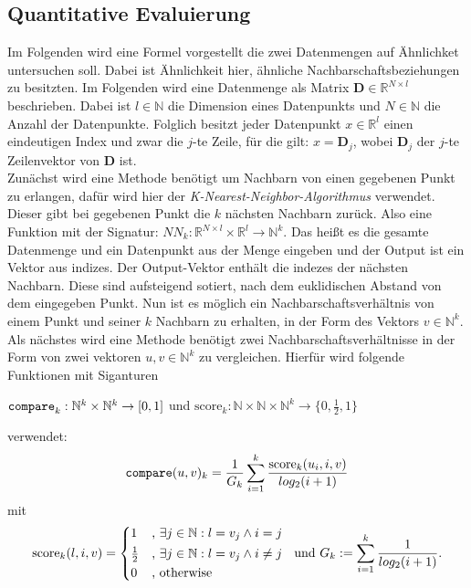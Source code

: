 \documentclass[12pt,letterpaper,ngerman]{article}
\begin{document}
\subsection{Quantitative Evaluierung} 
Im Folgenden wird eine Formel vorgestellt die zwei Datenmengen
auf Ähnlichket untersuchen soll. Dabei ist Ähnlichkeit hier,
ähnliche Nachbarschaftsbeziehungen zu besitzten. Im Folgenden
wird eine Datenmenge als Matrix 
$\mathbf{D} \in \mathbb{R}^{N\times l}$ beschrieben. Dabei 
ist $l \in \mathbb{N}$ die Dimension eines Datenpunkts und
$N \in \mathbb{N}$ die Anzahl der Datenpunkte. Folglich
besitzt jeder Datenpunkt $x \in \mathbb{R}^l$ einen eindeutigen
Index und zwar die $j$-te Zeile, für die gilt: $x = \mathbf{D}_j$, 
wobei $\mathbf{D}_j$ der $j$-te Zeilenvektor von $\mathbf{D}$ ist.\\
Zunächst wird eine Methode benötigt um Nachbarn von einen gegebenen
Punkt zu erlangen, dafür wird hier der 
\textit{K-Nearest-Neighbor-Algorithmus} verwendet. Dieser
gibt bei gegebenen Punkt die $k$ nächsten Nachbarn zurück. 
Also eine Funktion mit der Signatur: 
$NN_k: \mathbb{R}^{N\times l} \times \mathbb{R}^{l} \to \mathbb{N}^k$. 
Das heißt es die gesamte Datenmenge und ein Datenpunkt aus der Menge
eingeben und der Output ist ein Vektor aus indizes.
Der Output-Vektor enthält die indezes der nächsten Nachbarn. Diese sind 
aufsteigend sotiert, nach dem euklidischen Abstand von dem eingegeben
Punkt. Nun ist es möglich ein Nachbarschaftsverhältnis von einem Punkt
und seiner $k$ Nachbarn zu erhalten, in der Form des Vektors 
$v \in \mathbb{N}^k$.\\
Als nächstes wird eine Methode benötigt zwei 
Nachbarschaftsverhältnisse in der Form von 
zwei vektoren $u,v \in \mathbb{N}^k$ zu
vergleichen. Hierfür wird folgende Funktionen
mit Siganturen \\
\begin{center}
$\verb|compare|_k:\mathbb{N}^k \times \mathbb{N}^k \to [0,1]$ 
und $\text{score}_k: \mathbb{N} \times \mathbb{N} \times
\mathbb{N}^k \to \{0, \frac{1}{2}, 1\}$
\end{center}
verwendet:
\[
    \verb|compare|(u,v)_k = 
      \frac{1}{G_k} \sum^{k}_{i=1} 
      \frac{ \text{score}_{k}(u_i,i,v)}{log_2(i+1)}
\]
mit
\[
  \text{score}_k(l,i,v) = \begin{cases*} 
      1 & , $\exists j \in \mathbb{N}: l = v_j \land i = j$   \\
      \frac{1}{2} & , $\exists j \in \mathbb{N}: l = v_j \land i \neq j$\\
      0   & , \text{otherwise}
    \end{cases*}  \text{  und  }
    G_k := \sum_{i=1}^{k} \frac{1}{log_2(i+1)}.
\]
\end{document}
